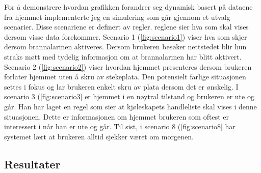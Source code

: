 For å demonstrere hvordan grafikken forandrer seg dynamisk basert på dataene fra hjemmet implementerte jeg en simulering som går gjennom et utvalg scenarier. Disse scenariene er definert av regler. reglene sier hva som skal vises dersom visse data forekommer. Scenario 1 (\ref{fig:scenario1}) viser hva som skjer dersom brannalarmen aktiveres. Dersom brukeren besøker nettstedet blir hun straks møtt med tydelig informasjon om at brannalarmen har blitt aktivert. Scenario 2 (\ref{fig:scenario2}) viser hvordan hjemmet presenteres dersom brukeren forlater hjemmet uten å skru av stekeplata. Den potensielt farlige situasjonen settes i fokus og lar brukeren enkelt skru av plata dersom det er ønskelig. I scenario 3 (\ref{fig:scenario3} er hjemmet i en nøytral tilstand og brukeren er ute og går. Han har laget en regel som sier at kjøleskapets handleliste skal vises i denne situasjonen. Dette er informasjonen om hjemmet brukeren som oftest er interessert i når han er ute og går. Til sist, i scenario 8 (\ref{fig:scenario8} har systemet lært at brukeren alltid sjekker været om morgenen.

\subsection{Resultater}
